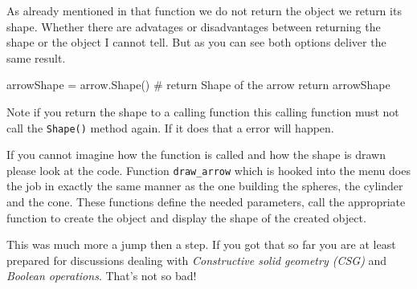 As already mentioned in that function we do not return the object we return its shape.
Whether there are advatages or disadvantages between returning the shape or the object I cannot tell.
But as you can see both options deliver the same result.
\begin{python}
    arrowShape = arrow.Shape() 
    # return Shape of the arrow
    return arrowShape
\end{python}
Note if you return the shape to a calling function this calling function must not call the {\tt Shape()} method again.
If it does that a error will happen.


If you cannot imagine how the function is called and how the shape is drawn please look at the code.
Function {\tt draw\_arrow} which is hooked into the menu does the job in exactly the same manner as the one building the spheres, the cylinder and the cone.
These functions define the needed parameters, call the appropriate function to create the object and display the shape of the created object. 

This was much more a jump then a step. 
If you got that  so far you are at least prepared for discussions dealing with {\it Constructive solid geometry (CSG)} and  {\it Boolean operations}.
That's not so bad!
